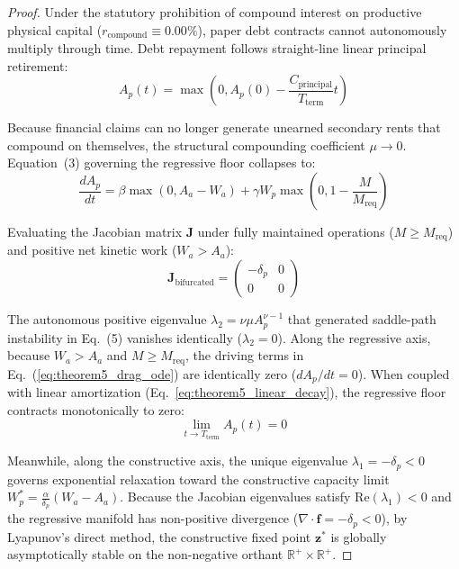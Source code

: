 \documentclass[preprint,12pt,authoryear]{elsarticle}
\theoremstyle{definition}
\begin{document}
\begin{proof}
Under the statutory prohibition of compound interest on productive physical capital ($r_{\text{compound}} \equiv 0.00\%$), paper debt contracts cannot autonomously multiply through time. Debt repayment follows straight-line linear principal retirement:
\begin{equation}
A_p(t) = \max\left(0, A_p(0) - \frac{C_{\text{principal}}}{T_{\text{term}}} t\right) \label{eq:theorem5_linear_decay}
\end{equation}

Because financial claims can no longer generate unearned secondary rents that compound on themselves, the structural compounding coefficient $\mu \to 0$. Equation~(3) governing the regressive floor collapses to:
\begin{equation}
\frac{dA_p}{dt} = \beta \max(0, A_a - W_a) + \gamma W_p \max\left(0, 1 - \frac{M}{M_{\text{req}}}\right) \label{eq:theorem5_drag_ode}
\end{equation}

Evaluating the Jacobian matrix $\mathbf{J}$ under fully maintained operations ($M \ge M_{\text{req}}$) and positive net kinetic work ($W_a > A_a$):
\begin{equation}
\mathbf{J}_{\text{bifurcated}} = \begin{pmatrix} -\delta_p & 0 \\ 0 & 0 \end{pmatrix} \label{eq:theorem5_jacobian}
\end{equation}

The autonomous positive eigenvalue $\lambda_2 = \nu \mu A_p^{\nu - 1}$ that generated saddle-path instability in Eq.~(5) vanishes identically ($\lambda_2 = 0$). Along the regressive axis, because $W_a > A_a$ and $M \ge M_{\text{req}}$, the driving terms in Eq.~(\ref{eq:theorem5_drag_ode}) are identically zero ($dA_p/dt = 0$). When coupled with linear amortization (Eq.~\ref{eq:theorem5_linear_decay}), the regressive floor contracts monotonically to zero:
\begin{equation}
\lim_{t \to T_{\text{term}}} A_p(t) = 0 \label{eq:theorem5_asymptotic_zero}
\end{equation}

Meanwhile, along the constructive axis, the unique eigenvalue $\lambda_1 = -\delta_p < 0$ governs exponential relaxation toward the constructive capacity limit $W_p^* = \frac{\alpha}{\delta_p}(W_a - A_a)$. Because the Jacobian eigenvalues satisfy $\text{Re}(\lambda_1) < 0$ and the regressive manifold has non-positive divergence ($\nabla \cdot \mathbf{f} = -\delta_p < 0$), by Lyapunov's direct method, the constructive fixed point $\mathbf{z}^*$ is globally asymptotically stable on the non-negative orthant $\mathbb{R}^+ \times \mathbb{R}^+$.
\end{proof}
\end{document}
